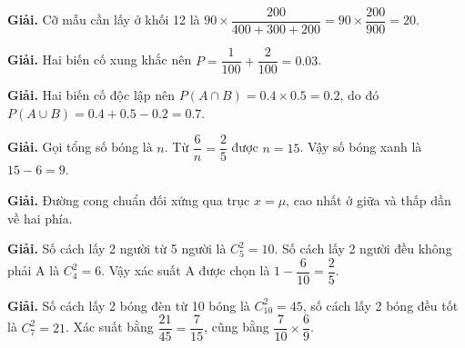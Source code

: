 \documentclass[11pt, a4paper]{article}
\begin{document}
\vspace{0.3cm}
\begin{dapan}[30 — Đáp án A]

\textbf{Giải.} Cỡ mẫu cần lấy ở khối 12 là $90 \times \dfrac{200}{400+300+200}=90 \times \dfrac{200}{900}=20$.


\end{dapan}
\vspace{0.3cm}
\begin{dapan}[31 — Đáp án C]

\textbf{Giải.} Hai biến cố xung khắc nên $P=\dfrac{1}{100}+\dfrac{2}{100}=0.03$.


\end{dapan}
\vspace{0.3cm}
\begin{dapan}[32 — Đáp án D]

\textbf{Giải.} Hai biến cố độc lập nên $P(A \cap B)=0.4 \times 0.5=0.2$, do đó $P(A \cup B)=0.4+0.5-0.2=0.7$.


\end{dapan}
\vspace{0.3cm}
\begin{dapan}[33 — Đáp án D]

\textbf{Giải.} Gọi tổng số bóng là $n$. Từ $\dfrac{6}{n}=\dfrac{2}{5}$ được $n=15$. Vậy số bóng xanh là $15-6=9$.


\end{dapan}
\vspace{0.3cm}
\begin{dapan}[34 — Đáp án B]

\textbf{Giải.} Đường cong chuẩn đối xứng qua trục $x=\mu$, cao nhất ở giữa và thấp dần về hai phía.


\end{dapan}
\vspace{0.3cm}
\begin{dapan}[35 — Đáp án A]

\textbf{Giải.} Số cách lấy 2 người từ 5 người là $C_5^2=10$. Số cách lấy 2 người đều không phải A là $C_4^2=6$. Vậy xác suất A được chọn là $1-\dfrac{6}{10}=\dfrac{2}{5}$.


\end{dapan}
\vspace{0.3cm}
\begin{dapan}[36 — Đáp án A]

\textbf{Giải.} Số cách lấy 2 bóng đèn từ 10 bóng là $C_{10}^2=45$, số cách lấy 2 bóng đều tốt là $C_7^2=21$. Xác suất bằng $\dfrac{21}{45}=\dfrac{7}{15}$, cũng bằng $\dfrac{7}{10} \times \dfrac{6}{9}$.


\end{dapan}
\end{document}
